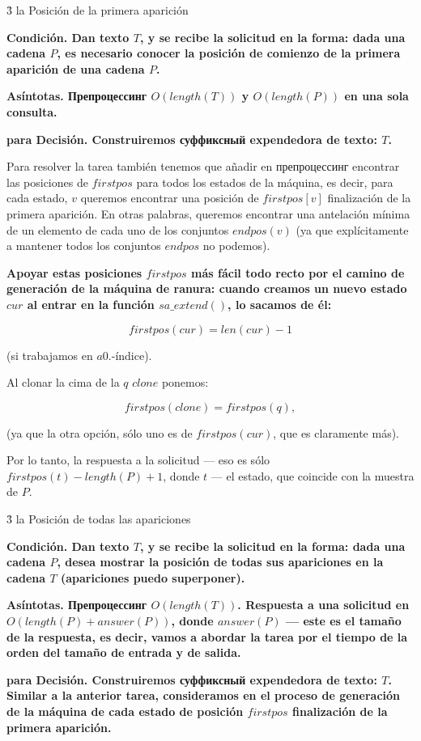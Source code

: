 \h3{ la Posición de la primera aparición }

\bf{Condición}. Dan texto $T$, y se recibe la solicitud en la forma: dada una cadena $P$, es necesario conocer la posición de comienzo de la primera aparición de una cadena $P$.

\bf{Asíntotas}. Препроцессинг $O (length (T))$ y $O (length (P))$ en una sola consulta.

\bf{para Decisión}. Construiremos суффиксный expendedora de texto: $T$.

Para resolver la tarea también tenemos que añadir en препроцессинг encontrar las posiciones de $firstpos$ para todos los estados de la máquina, es decir, para cada estado, $v$ queremos encontrar una posición de $firstpos[v]$ finalización de la primera aparición. En otras palabras, queremos encontrar una antelación mínima de un elemento de cada uno de los conjuntos $endpos(v)$ (ya que explícitamente a mantener todos los conjuntos $endpos$ no podemos).

\bf{Apoyar} estas posiciones $firstpos$ más fácil todo recto por el camino de generación de la máquina de ranura: cuando creamos un nuevo estado $cur$ al entrar en la función $sa\_extend()$, lo sacamos de él:

$$ firstpos(cur) = len(cur) - 1 $$

(si trabajamos en $a$0.-índice).

Al clonar la cima de la $q$ $clone$ ponemos:

$$ firstpos(clone) = firstpos(q), $$

(ya que la otra opción, sólo uno es de $firstpos(cur)$, que es claramente más).

Por lo tanto, la respuesta a la solicitud --- eso es sólo $firstpos(t)-length(P)+1$, donde $t$ --- el estado, que coincide con la muestra de $P$.


\h3{ la Posición de todas las apariciones }

\bf{Condición}. Dan texto $T$, y se recibe la solicitud en la forma: dada una cadena $P$, desea mostrar la posición de todas sus apariciones en la cadena $T$ (apariciones puedo superponer).

\bf{Asíntotas}. Препроцессинг $O (length (T))$. Respuesta a una solicitud en $O (length (P) + answer (P))$, donde $answer(P)$ --- este es el tamaño de la respuesta, es decir, vamos a abordar la tarea por el tiempo de la orden del tamaño de entrada y de salida.

\bf{para Decisión}. Construiremos суффиксный expendedora de texto: $T$. Similar a la anterior tarea, consideramos en el proceso de generación de la máquina de cada estado de posición $firstpos$ finalización de la primera aparición.

